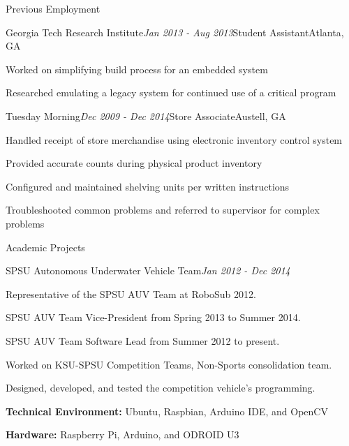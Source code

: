\documentclass[11pt]{resume} %
\begin{document}
\begin{rSection}{Previous Employment}

\begin{rSubsection}{Georgia Tech Research Institute}{\em Jan 2013 - Aug 2013}{Student Assistant}{Atlanta, GA}
\item Worked on simplifying build process for an embedded system
\item Researched emulating a legacy system for continued use of a critical program
\end{rSubsection}

\begin{rSubsection}{Tuesday Morning}{\em Dec 2009 - Dec 2014}{Store Associate}{Austell, GA}
\item Handled receipt of store merchandise using electronic inventory control system
\item Provided accurate counts during physical product inventory
\item Configured and maintained shelving units per written instructions
\item Troubleshooted common problems and referred to supervisor for complex problems
\end{rSubsection}

\end{rSection}


\begin{rSection}{Academic Projects}

\begin{rSubsection}{SPSU Autonomous Underwater Vehicle Team}{\em Jan 2012 - Dec 2014}{}{}

\item Representative of the SPSU AUV Team at RoboSub 2012.
\item SPSU AUV Team Vice-President from Spring 2013 to Summer 2014.
\item SPSU AUV Team Software Lead from Summer 2012 to present.
\item Worked on KSU-SPSU Competition Teams, Non-Sports consolidation team.
\item Designed, developed, and tested the competition vehicle's programming.
\item \textbf{Technical Environment:} Ubuntu, Raspbian, Arduino IDE, and OpenCV
\item \textbf{Hardware:} Raspberry Pi, Arduino, and ODROID U3
\end{rSubsection}

\end{rSection}
\end{document}
